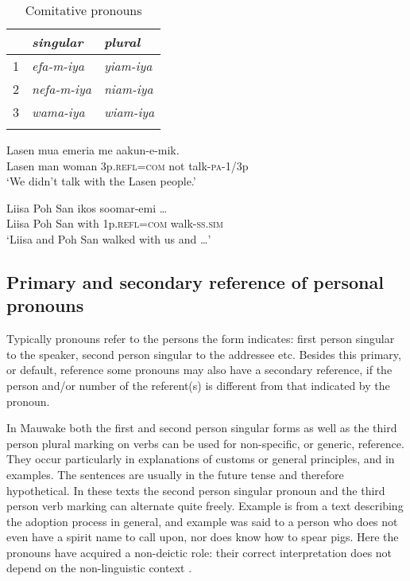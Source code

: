 \begin{table}
\caption{Comitative pronouns}
\label{tab:3:comitativepron}
 
\begin{tabular}{l>{\itshape}l>{\itshape}l}
\mytoprule
 &\upshape singular &\upshape plural\\
\midrule
1 &efa-m-iya &yiam-iya\\
2 &nefa-m-iya &niam-iya\\
3 &wama-iya &wiam-iya\\
\mybottomrule
\end{tabular}
\end{table}


\ea%
\label{ex:3:x619}
\gll Lasen mua emeria  me aakun-e-mik. \\
Lasen man woman 3p.\textsc{refl}=\textsc{com} not talk-\textsc{pa}-1/3p\\
\glt`We didn't talk with the Lasen people.'
\z

\ea%
\label{ex:3:x620}
\gll Liisa Poh San ikos  soomar-emi {\dots} \\
Liisa Poh San with 1p.\textsc{refl}=\textsc{com} walk-\textsc{ss}.\textsc{sim}\\
\glt`Liisa and Poh San walked with us and {\dots}'
\z

\subsection{Primary and secondary reference of personal pronouns}
{}
Typically pronouns refer to the persons the form indicates: first person singular to the speaker, second person singular to the addressee etc. Besides this primary, or default, reference some pronouns may also have a secondary reference, if the person and/or number of the referent(s) is different from that indicated by the pronoun.

In Mauwake both the first and second person singular forms as well as the third person plural marking on verbs can be used for non-specific, or generic, reference. They occur particularly in explanations of customs or general principles, and in examples. The sentences are usually in the future tense and therefore hypothetical. In these texts the second person singular pronoun and the third person verb marking can alternate quite freely. Example  is from a text describing the adoption process in general, and example  was said to a person who does not even have a spirit name to call upon, nor does know how to spear pigs. Here the pronouns have acquired a non-deictic role: their correct interpretation does not depend on the non-linguistic context \citep[260]{AndersonEtAl1985}%
.

